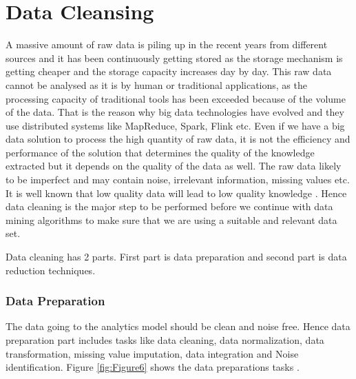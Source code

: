\documentclass[sigconf]{acmart}
\begin{document}
\section{Data Cleansing}

A massive amount of raw data is piling up in the recent years from different sources and it has been continuously getting stored as the storage mechanism is getting cheaper and the storage capacity increases day by day. This raw data cannot be analysed as it is by human or traditional applications, as the processing capacity of traditional tools has been exceeded because of the volume of the data. That is the reason why big data technologies have evolved and they use distributed systems like MapReduce, Spark, Flink etc. Even if we have a big data solution to process the high quantity of raw data, it is not the efficiency and performance of the solution that determines the quality of the knowledge extracted but it depends on the quality of the data as well. The raw data likely to be imperfect and may contain noise, irrelevant information, missing values etc. It is well known that low quality data will lead to low quality knowledge \cite{preprocessing}. Hence data cleaning is the major step to be performed before we continue with data mining algorithms to make sure that we are using a suitable and relevant data set. 

Data cleaning has 2 parts. First part is data preparation and second part is data reduction techniques. 

\subsubsection{Data Preparation}

The data going to the analytics model should be clean and noise free. Hence data preparation part includes tasks like data cleaning, data normalization, data transformation, missing value imputation, data integration and Noise identification. Figure \ref{fig:Figure6} shows the data preparations tasks \cite{preprocessing}.
\end{document}
